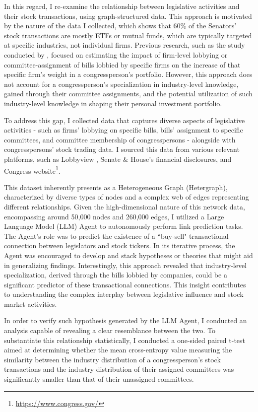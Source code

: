 \documentclass[15pt,letterpaper]{article}
\begin{document}
In this regard, I re-examine the relationship between legislative activities and their stock transactions, using graph-structured data. This approach is motivated by the nature of the data I collected, which shows that 60\% of the Senators' stock transactions are mostly ETFs or mutual funds, which are typically targeted at specific industries, not individual firms.
Previous research, such as the study conducted by \cite{eg14}, focused on estimating the impact of firm-level lobbying or committee-assignment of bills lobbied by specific firms on the increase of that specific firm's weight in a congressperson's portfolio. However, this approach does not account for a congressperson's specialization in industry-level knowledge, gained through their committee assignments, and the potential utilization of such industry-level knowledge in shaping their personal investment portfolio.


To address this gap, I collected data that captures diverse aspects of legislative activities - such as firms' lobbying on specific bills, bills' assignment to specific committees, and committee membership of congresspersons - alongside with congresspersons' stock trading data. I sourced this data from various relevant platforms, such as Lobbyview \citep{kim2018}, Senate \& House's financial disclosures, and Congress website\footnote{\url{https://www.congress.gov/}}.

This dataset inherently presents as a Heterogeneous Graph (Hetergraph), characterized by diverse types of nodes and a complex web of edges representing different relationships. 
Given the high-dimensional nature of this network data, encompassing around 50,000 nodes and 260,000 edges, I utilized a Large Language Model (LLM) Agent to autonomously perform link prediction tasks. 
The Agent's role was to predict the existence of a ``buy-sell" transactional connection between legislators and stock tickers. In its iterative process, the Agent was encouraged to develop and stack hypotheses or theories that might aid in generalizing findings. Interestingly, this approach revealed that industry-level specialization, derived through the bills lobbied by companies, could be a significant predictor of these transactional connections. This insight contributes to understanding the complex interplay between legislative influence and stock market activities.


In order to verify such hypothesis generated by the LLM Agent, 
I conducted an analysis capable of revealing a clear resemblance between the two. To substantiate this relationship statistically, I conducted a one-sided paired t-test \citep{hsu2014paired} aimed at determining whether the mean cross-entropy value measuring the similarity between the industry distribution of a congressperson's stock transactions and the industry distribution of their assigned committees was significantly smaller than that of their unassigned committees.
\end{document}
